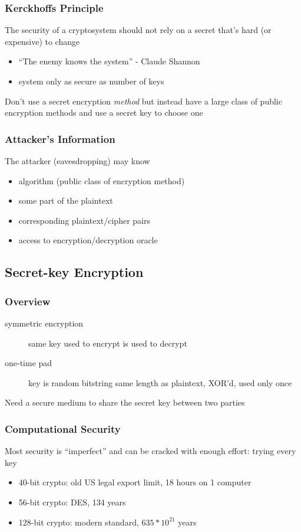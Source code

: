 \documentclass[]{article}
\theoremstyle{definition}
\begin{document}
	\subsubsection{Kerckhoffs Principle}
	The security of a cryptosystem should not rely on a secret that's hard (or expensive) to change 
	\begin{itemize}
		\item ``The enemy knows the system'' - Claude Shannon
		\item system only as secure as number of keys
	\end{itemize}
	Don't use a secret encryption \textit{method} but instead have a large class of public encryption methods and use a secret key to choose one
	
	\subsubsection{Attacker's Information}
	The attacker (eavesdropping) may know
	\begin{itemize}
		\item algorithm (public class of encryption method)
		\item some part of the plaintext
		\item corresponding plaintext/cipher pairs
		\item access to encryption/decryption oracle
	\end{itemize}
	
	\subsection{Secret-key Encryption}
	\subsubsection{Overview}
	\begin{description}
		\item[symmetric encryption] same key used to encrypt is used to decrypt
		\item[one-time pad] key is random bitstring same length as plaintext, XOR'd, used only once
	\end{description}
	Need a secure medium to share the secret key between two parties

	\subsubsection{Computational Security}
	Most security is ``imperfect'' and can be cracked with enough effort: trying every key
	\begin{itemize}
		\item 40-bit crypto: old US legal export limit, 18 hours on 1 computer
		\item 56-bit crypto: DES, 134 years
		\item 128-bit crypto: modern standard, $635*10^{21}$ years
	\end{itemize}
\end{document}
